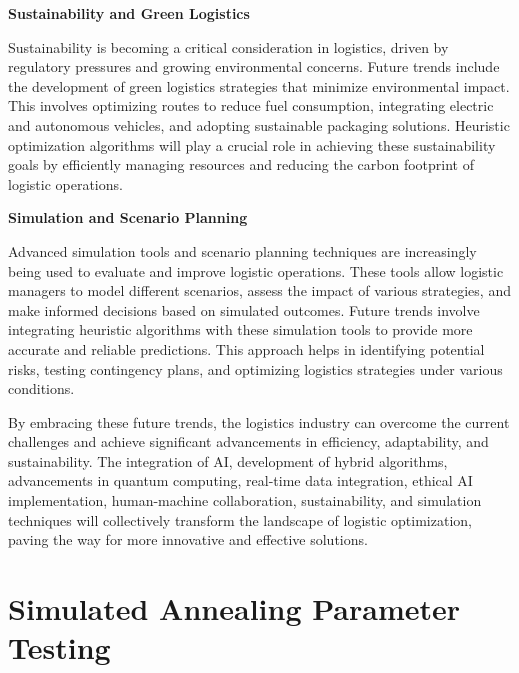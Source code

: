 \documentclass[
]{article}
\begin{document}
    \textbf{Sustainability and Green Logistics}

    Sustainability is becoming a critical consideration in logistics, driven by regulatory pressures and growing environmental concerns. Future trends include the development of green logistics strategies that minimize environmental impact. This involves optimizing routes to reduce fuel consumption, integrating electric and autonomous vehicles, and adopting sustainable packaging solutions. Heuristic optimization algorithms will play a crucial role in achieving these sustainability goals by efficiently managing resources and reducing the carbon footprint of logistic operations.

    \textbf{Simulation and Scenario Planning}

    Advanced simulation tools and scenario planning techniques are increasingly being used to evaluate and improve logistic operations. These tools allow logistic managers to model different scenarios, assess the impact of various strategies, and make informed decisions based on simulated outcomes. Future trends involve integrating heuristic algorithms with these simulation tools to provide more accurate and reliable predictions. This approach helps in identifying potential risks, testing contingency plans, and optimizing logistics strategies under various conditions.

    By embracing these future trends, the logistics industry can overcome the current challenges and achieve significant advancements in efficiency, adaptability, and sustainability. The integration of AI, development of hybrid algorithms, advancements in quantum computing, real-time data integration, ethical AI implementation, human-machine collaboration, sustainability, and simulation techniques will collectively transform the landscape of logistic optimization, paving the way for more innovative and effective solutions.


    \newpage


    \section{Simulated Annealing Parameter Testing}\label{sec:simulated-annealing-parameter-testing}
\end{document}
